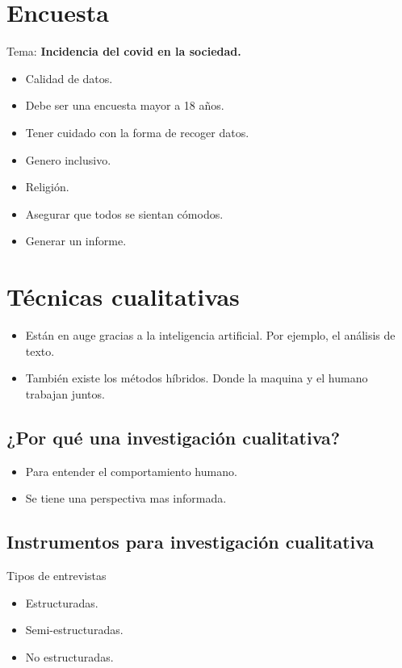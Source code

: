 \section{Encuesta}

Tema: \textbf{Incidencia del covid en la sociedad.}

\begin{itemize}
    \item Calidad de datos.
    \item Debe ser una encuesta mayor a 18 años.
    \item Tener cuidado con la forma de recoger datos.
    \item Genero inclusivo.
    \item Religión.
    \item Asegurar que todos se sientan cómodos.
    \item Generar un informe.
\end{itemize}


\section{Técnicas cualitativas}

\begin{itemize}
    \item Están en auge gracias a la inteligencia artificial. Por ejemplo, el análisis de texto.
    \item También existe los métodos híbridos. Donde la maquina y el humano trabajan juntos.
\end{itemize}

\subsection{¿Por qué una investigación cualitativa?}

\begin{itemize}
    \item Para entender el comportamiento humano.
    \item Se tiene una perspectiva mas informada.
\end{itemize}


\subsection{Instrumentos para investigación cualitativa}

Tipos de entrevistas

\begin{itemize}
    \item Estructuradas.
    \item Semi-estructuradas.
    \item No estructuradas.
\end{itemize}

